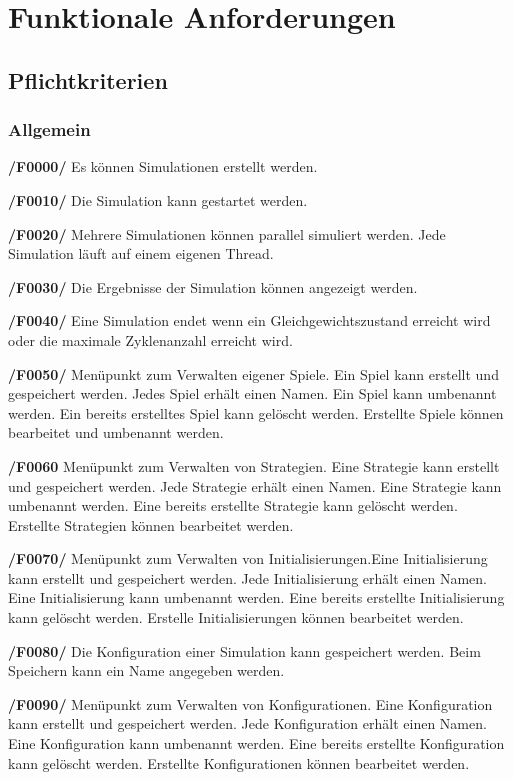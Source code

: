\section{Funktionale Anforderungen}

\subsection{Pflichtkriterien}

\subsubsection{Allgemein}

\textbf{/F0000/}
Es können Simulationen erstellt werden.

\textbf{/F0010/} 
Die Simulation kann gestartet werden.

\textbf{/F0020/}
{\color{red} Mehrere Simulationen können parallel simuliert werden. Jede Simulation läuft auf einem eigenen Thread.
}

\textbf{/F0030/} 
Die Ergebnisse der Simulation können angezeigt werden.

\textbf{/F0040/}
Eine Simulation endet wenn ein Gleichgewichtszustand erreicht wird oder
die maximale Zyklenanzahl erreicht wird.

\textbf{/F0050/}
Menüpunkt zum Verwalten eigener Spiele. Ein Spiel kann erstellt und gespeichert werden. Jedes Spiel erhält einen Namen. Ein Spiel kann umbenannt werden. Ein bereits erstelltes Spiel kann gelöscht werden. Erstellte Spiele können bearbeitet und umbenannt werden.

\textbf{/F0060}
Menüpunkt zum Verwalten von Strategien. Eine Strategie kann erstellt und gespeichert werden. Jede Strategie erhält einen Namen. Eine Strategie kann umbenannt werden. Eine bereits erstellte Strategie kann gelöscht werden. Erstellte Strategien können bearbeitet werden.

\textbf{/F0070/}
Menüpunkt zum Verwalten von Initialisierungen.Eine Initialisierung kann erstellt und gespeichert werden. Jede Initialisierung  erhält einen Namen. Eine Initialisierung kann umbenannt werden. Eine bereits erstellte Initialisierung kann gelöscht werden. Erstelle Initialisierungen können bearbeitet werden.

\textbf{/F0080/}
Die Konfiguration einer Simulation kann gespeichert werden. Beim Speichern kann ein Name angegeben werden.

\textbf{/F0090/}
Menüpunkt zum Verwalten von Konfigurationen. Eine Konfiguration kann erstellt und gespeichert werden. Jede Konfiguration erhält einen Namen. Eine Konfiguration kann umbenannt werden. Eine bereits erstellte Konfiguration kann gelöscht werden. Erstellte Konfigurationen können bearbeitet werden.

